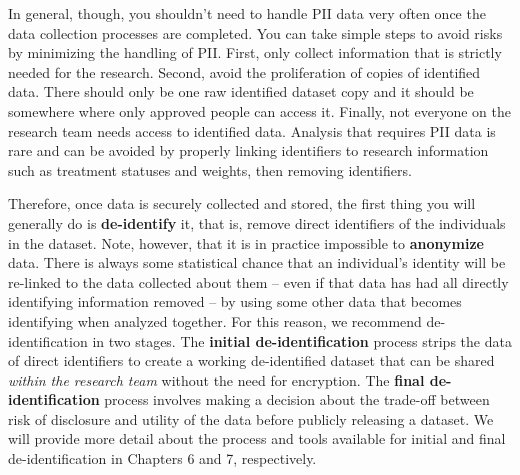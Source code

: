 In general, though, you shouldn't need to handle PII data very often
once the data collection processes are completed.
You can take simple steps to avoid risks by minimizing the handling of PII.
First, only collect information that is strictly needed for the research.
Second, avoid the proliferation of copies of identified data.
There should only be one raw identified dataset copy
and it should be somewhere where only approved people can access it.
Finally, not everyone on the research team needs access to identified data.
Analysis that requires PII data is rare
and can be avoided by properly linking identifiers to research information
such as treatment statuses and weights, then removing identifiers.

Therefore, once data is securely collected and stored,
the first thing you will generally do is \textbf{de-identify} it,
that is, remove direct identifiers of the individuals in the dataset.
Note, however, that it is in practice impossible to \textbf{anonymize} data.
There is always some statistical chance that an individual's identity
will be re-linked to the data collected about them
-- even if that data has had all directly identifying information removed --
by using some other data that becomes identifying when analyzed together.
For this reason, we recommend de-identification in two stages.
The \textbf{initial de-identification} process strips the data of direct identifiers
to create a working de-identified dataset that
can be shared \textit{within the research team} without the need for encryption.
The \textbf{final de-identification} process involves
making a decision about the trade-off between
risk of disclosure and utility of the data
before publicly releasing a dataset.
We will provide more detail about the process and tools available
for initial and final de-identification in Chapters 6 and 7, respectively.

